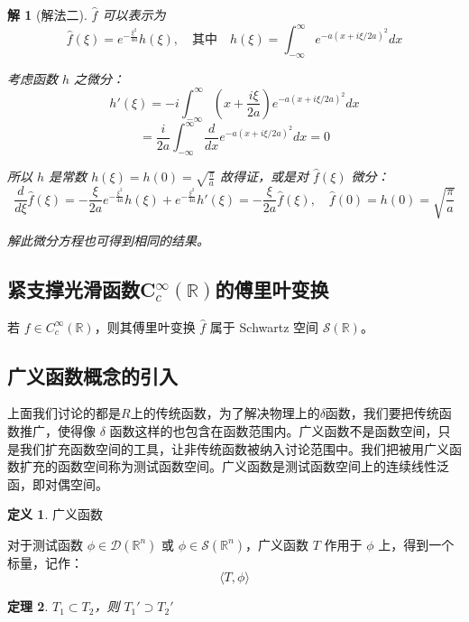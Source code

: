 \documentclass[12pt,a4paper]{article}
\theoremstyle{plain}
\newtheorem{theorem}{定理}[section]
\newtheorem{solution}{解}
\theoremstyle{definition}
\newtheorem{definition}[theorem]{定义}
\theoremstyle{remark}
\begin{document}
\begin{solution}[解法二]
	$\widehat{f}$ 可以表示为
	\[
	\widehat{f}(\xi) = e^{-\frac{\xi^2}{4a}} h(\xi), \quad \text{其中} \quad h(\xi) = \int_{-\infty}^{\infty} e^{-a(x + i\xi/2a)^2} dx
	\]
	
	考虑函数 $h$ 之微分：
	\[
	h'(\xi) = -i \int_{-\infty}^{\infty} \left(x + \frac{i\xi}{2a}\right) e^{-a(x + i\xi/2a)^2} dx
	\]
	\[
	= \frac{i}{2a} \int_{-\infty}^{\infty} \frac{d}{dx} e^{-a(x + i\xi/2a)^2} dx = 0
	\]
	
	所以 $h$ 是常数 $h(\xi) = h(0) = \sqrt{\frac{\pi}{a}}$ 故得证，或是对 $\widehat{f}(\xi)$ 微分：
	\[
	\frac{d}{d\xi} \widehat{f}(\xi) = -\frac{\xi}{2a} e^{-\frac{\xi^2}{4a}} h(\xi) + e^{-\frac{\xi^2}{4a}} h'(\xi) = -\frac{\xi}{2a} \widehat{f}(\xi), \quad \widehat{f}(0) = h(0) = \sqrt{\frac{\pi}{a}}
	\]
	
	解此微分方程也可得到相同的结果。
\end{solution}



\subsection{紧支撑光滑函数C$_c^\infty(\mathbb{R})$的傅里叶变换}
若 $f \in C_c^\infty(\mathbb{R})$，则其傅里叶变换 $\hat{f}$ 属于 Schwartz 空间 $\mathcal{S}(\mathbb{R})$。



\subsection{广义函数概念的引入}
上面我们讨论的都是$R$上的传统函数，为了解决物理上的$\delta$函数，我们要把传统函数推广，使得像 $\delta$ 函数这样的也包含在函数范围内。广义函数不是函数空间，只是我们扩充函数空间的工具，让非传统函数被纳入讨论范围中。我们把被用广义函数扩充的函数空间称为测试函数空间。广义函数是测试函数空间上的连续线性泛函，即对偶空间。



\begin{definition}广义函数
	
对于测试函数 \(\phi \in \mathcal{D}(\mathbb{R}^n)\) 或 \(\phi \in \mathcal{S}(\mathbb{R}^n)\)，广义函数 \(T\) 作用于 \(\phi\) 上，得到一个标量，记作：
\[
\langle T, \phi \rangle
\]

\end{definition}

\begin{theorem}
	\(T_1 \subset T_2\)，则 \(T_1' \supset T_2'\)
\end{theorem}
\end{document}

